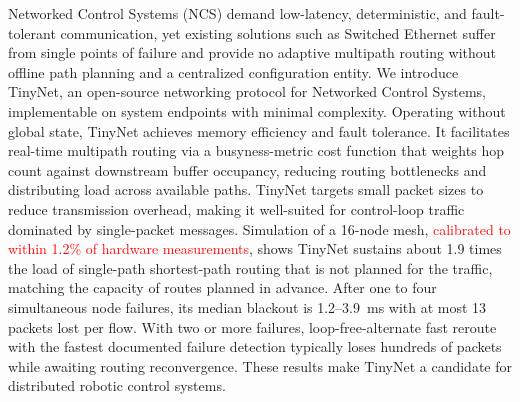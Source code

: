 Networked Control Systems (NCS) demand low-latency, deterministic, and fault-tolerant communication, yet existing solutions such as Switched Ethernet suffer from single points of failure and provide no adaptive multipath routing without offline path planning and a centralized configuration entity. We introduce TinyNet, an open-source networking protocol for Networked Control Systems, implementable on system endpoints with minimal complexity. Operating without global state, TinyNet achieves memory efficiency and fault tolerance. It facilitates real-time multipath routing via a busyness-metric cost function that weights hop count against downstream buffer occupancy, reducing routing bottlenecks and distributing load across available paths. TinyNet targets small packet sizes to reduce transmission overhead, making it well-suited for control-loop traffic dominated by single-packet messages. Simulation of a 16-node mesh, \textcolor{red}{calibrated to within 1.2\% of hardware measurements}, shows TinyNet sustains about 1.9 times the load of single-path shortest-path routing that is not planned for the traffic, matching the capacity of routes planned in advance. After one to four simultaneous node failures, its median blackout is 1.2--3.9~ms with at most 13 packets lost per flow. With two or more failures, loop-free-alternate fast reroute with the fastest documented failure detection typically loses hundreds of packets while awaiting routing reconvergence. These results make TinyNet a candidate for distributed robotic control systems.
